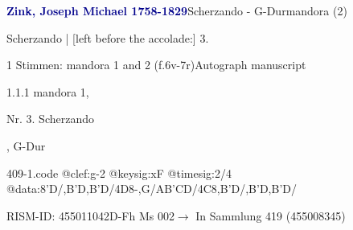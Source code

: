 \documentclass[twocolumn]{book}
\begin{document}
\par \vspace{7pt} \textcolor{darkblue}{\textbf{Zink, Joseph Michael  1758-1829}}\hfillplus{\textbf{[409]}}\newline Scherzando - G-Dur\newline mandora (2)
\par \begin{itshape} Scherzando | [left before the accolade:] 3.\end{itshape} 
\par \textcolor{darkblue}{}  1 Stimmen: mandora 1 and 2  (f.6v-7r)\newline Autograph manuscript
\par 1.1.1  mandora 1, \begin{itshape}Nr. 3. Scherzando\end{itshape}, G-Dur  
\begin{filecontents*}{409-1.code}
@clef:g-2
@keysig:xF
@timesig:2/4
@data:8'D/,B'D,B'D/4D8-,G/AB'CD/4C8,B'D/,B'D,B'D/
\end{filecontents*}
\newline
%
\par RISM-ID: 455011042\newline D-Fh  Ms 002\newline $\rightarrow$ In Sammlung 419 (455008345)
      
\end{document}
